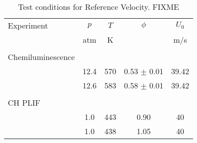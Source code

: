 \begin{table}
  \caption[Test conditions for Equivalence Ratio]{Test conditions for Reference Velocity. FIXME}
  \begin{center}
    \begin{tabular}{lcccc}
      Experiment & \(p\) & \(T\) & \(\phi\) & \(U_0\) \tabularnewline
      & atm & K & & m/s \tabularnewline
      \hline\hline
      & & & & \tabularnewline
      Chemiluminescence & & & & \tabularnewline
      \hline
      & 12.4 & 570 & 0.53 \(\pm\) 0.01 & 39.42 \tabularnewline
      & 12.6 & 583 & 0.58 \(\pm\) 0.01 & 39.42 \tabularnewline
      & & & & \tabularnewline
      CH PLIF & & & & \tabularnewline
      \hline
      & 1.0 & 443 & 0.90 & 40 \tabularnewline
      & 1.0 & 438 & 1.05 & 40 \tabularnewline
      \hline
    \end{tabular}
  \end{center}
  \label{tab:equivalenceRatioCases}
\end{table}

